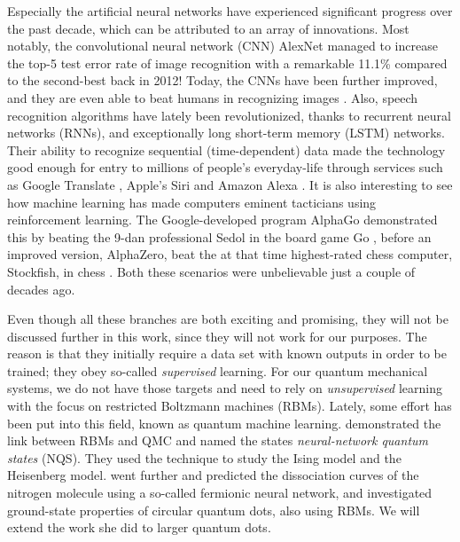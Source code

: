 Especially the artificial neural networks have experienced significant progress over the past decade, which can be attributed to an array of innovations. Most notably, the convolutional neural network (CNN) AlexNet \cite{krizhevsky_imagenet_2012} managed to increase the top-5 test error rate of image recognition with a remarkable 11.1\% compared to the second-best back in 2012! Today, the CNNs have been further improved, and they are even able to beat humans in recognizing images \cite{alom_history_2018}. Also, speech recognition algorithms have lately been revolutionized, thanks to recurrent neural networks (RNNs), and exceptionally long short-term memory (LSTM) networks. Their ability to recognize sequential (time-dependent) data made the technology good enough for entry to millions of people's everyday-life through services such as Google Translate \cite{wu_googles_2016}, Apple's Siri \cite{smith_ios_2016} and Amazon Alexa \cite{noauthor_bringing_nodate}. It is also interesting to see how machine learning has made computers eminent tacticians using reinforcement learning. The Google-developed program AlphaGo demonstrated this by beating the 9-dan professional Sedol in the board game Go \cite{noauthor_alphago_nodate}, before an improved version, AlphaZero, beat the at that time highest-rated chess computer, Stockfish, in chess \cite{klein_mikeklein_googles_nodate}. Both these scenarios were unbelievable just a couple of decades ago.

Even though all these branches are both exciting and promising, they will not be discussed further in this work, since they will not work for our purposes. The reason is that they initially require a data set with known outputs in order to be trained; they obey so-called \textit{supervised} learning. For our quantum mechanical systems, we do not have those targets and need to rely on \textit{unsupervised} learning with the focus on restricted Boltzmann machines (RBMs). Lately, some effort has been put into this field, known as quantum machine learning. \citet{carleo_solving_2017} demonstrated the link between RBMs and QMC and named the states \textit{neural-network quantum states} (NQS). They used the technique to study the Ising model and the Heisenberg model. \citet{pfau2019abinitio} went further and predicted the dissociation curves of the nitrogen molecule using a so-called fermionic neural network, and \citet{flugsrud_vilde_moe_solving_nodate} investigated ground-state properties of circular quantum dots, also using RBMs. We will extend the work she did to larger quantum dots.

